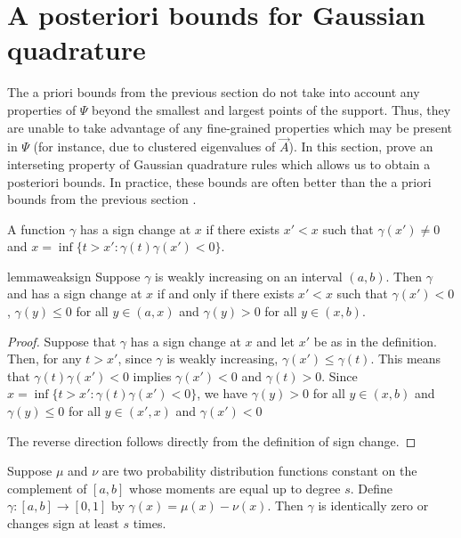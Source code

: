 

\section{A posteriori bounds for Gaussian quadrature}

The a priori bounds from the previous section do not take into account any properties of \( \Psi \) beyond the smallest and largest points of the support. 
Thus, they are unable to take advantage of any fine-grained properties which may be present in \( \Psi \) (for instance, due to clustered eigenvalues of \( \vec{A} \)).
In this section, prove an interseting property of Gaussian quadrature rules which allows us to obtain a posteriori bounds.
In practice, these bounds are often better than the a priori bounds from the previous section \cite{chen_trogdon_ubaru_21}.


\begin{definition}
A function \( \gamma \) has a sign change at \( x \) if there exists \( x' < x \) such that \( \gamma(x')\neq 0 \) and \( x = \inf\{t > x' : \gamma(t) \gamma(x') < 0 \} \).
\end{definition}

\begin{restatable}{lemma}{weaksign}
\label{thm:weak_sign}
Suppose \( \gamma \) is weakly increasing on an interval \( (a,b) \).
Then \( \gamma \) and has a sign change at \( x \) if and only if there exists \( x'<x \) such that \( \gamma(x') < 0 \), \( \gamma(y) \leq 0 \) for all \( y\in(a,x) \) and \( \gamma(y) > 0 \) for all \( y\in(x,b) \).
\end{restatable}

\begin{proof}
Suppose that \( \gamma \) has a sign change at \( x \) and let \( x' \) be as in the definition.
Then, for any \( t > x' \), since \( \gamma \) is weakly increasing, \( \gamma(x') \leq \gamma(t) \).
This means that \( \gamma(t) \gamma(x') < 0 \) implies \( \gamma(x') < 0 \) and \( \gamma(t) > 0 \).
Since \( x = \inf\{t > x' : \gamma(t) \gamma(x') < 0 \}\), we have \( \gamma(y) > 0 \) for all \( y\in(x,b) \) and \( \gamma(y) \leq 0 \) for all \( y\in(x',x) \) and \( \gamma(x') < 0 \)

The reverse direction follows directly from the definition of sign change.
\end{proof}

\begin{theorem}
\label{thm:moments_CDF}
Suppose \( \mu \) and \( \nu \) are two probability distribution functions constant on the complement of \( [a,b] \) whose moments are equal up to degree \( s \).
Define \( \gamma : [a,b] \to [0,1] \) by \( \gamma(x) = \mu(x) - \nu(x) \).
Then \( \gamma \) is identically zero or changes sign at least \( s \) times.
\end{theorem}

